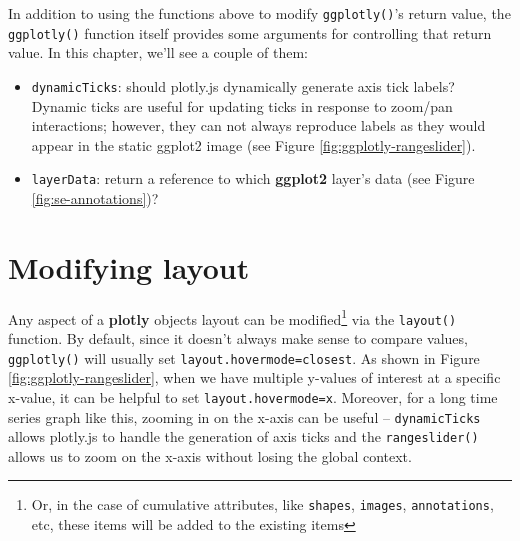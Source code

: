 \documentclass[
  12pt,
]{krantz}
\makeatletter
\providecommand{\tightlist}{%
  \setlength{\itemsep}{0pt}\setlength{\parskip}{0pt}}
\newcommand{\indexc}[1]{\index{#1@\texttt{#1}}}
\makeatother
\begin{document}

In addition to using the functions above to modify \texttt{ggplotly()}'s return value, the \texttt{ggplotly()} function itself provides some arguments for controlling that return value. In this chapter, we'll see a couple of them:

\begin{itemize}
\tightlist
\item
  \texttt{dynamicTicks}: should plotly.js dynamically generate axis tick labels? Dynamic ticks are useful for updating ticks in response to zoom/pan interactions; however, they can not always reproduce labels as they would appear in the static ggplot2 image (see Figure \ref{fig:ggplotly-rangeslider}).
\item
  \texttt{layerData}: return a reference to which \textbf{ggplot2} layer's data (see Figure \ref{fig:se-annotations})?
\end{itemize}

\hypertarget{modifying-layout}{%
\section{Modifying layout}\label{modifying-layout}}

Any aspect of a \textbf{plotly} objects layout can be modified\footnote{Or, in the case of cumulative attributes, like \texttt{shapes}, \texttt{images}, \texttt{annotations}, etc, these items will be added to the existing items} via the \texttt{layout()} function. By default, since it doesn't always make sense to compare values, \texttt{ggplotly()} will usually set \texttt{layout.hovermode=\textquotesingle{}closest\textquotesingle{}}. As shown in Figure \ref{fig:ggplotly-rangeslider}, when we have multiple y-values of interest at a specific x-value, it can be helpful to set \texttt{layout.hovermode=\textquotesingle{}x\textquotesingle{}}. Moreover, for a long time series graph like this, zooming in on the x-axis can be useful -- \texttt{dynamicTicks} allows plotly.js to handle the generation of axis ticks and the \texttt{rangeslider()} allows us to zoom on the x-axis without losing the global context.

\indexc{rangeslider()}

\end{document}
